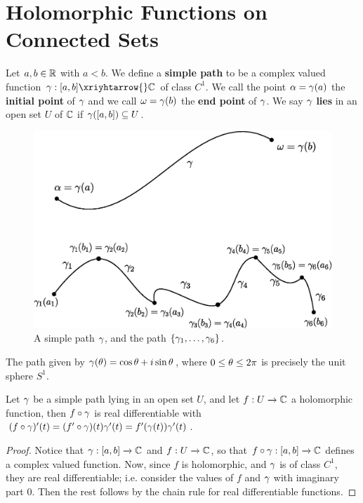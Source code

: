 \section{Holomorphic Functions on Connected Sets}

\begin{definition}
    Let $a,b \in \mathbb{R}$ with $a<b$. We define a \textbf{simple path} to be a
    complex valued function $\y:[a,b] \xriyhtarrow{} \C$ of class $C^1$. We call
    the point $\alpha=\gamma(a)$ the \textbf{initial point} of $\gamma$ and we call
    $\omega=\gamma(b)$ the \textbf{end point} of $\gamma$. We say $\gamma$ \textbf{lies} in an
    open set $U$ of $\mathbb{C}$ if  $\gamma([a,b]) \subseteq U$.
\end{definition}

\begin{figure}[h]
    \centering
    \includegraphics[scale=0.5]{Figures/Chapter3/path.eps}
    \caption{A simple path $\gamma$, and the path $\{\gamma_1, \dots, \gamma_6\}$.}
    \label{figure_3.1}
\end{figure}

\begin{example}\label{example_3.1}
    The path given by $\gamma(\theta)=\cos{\theta}+i\sin{\theta}$, where $0 \leq \theta \leq
    2\pi$ is precisely the unit sphere $S^1$.
\end{example}

\begin{lemma}\label{3.1.1}
    Let $\gamma$ be a simple path lying in an open set $U$, and let $f:U
    \xrightarrow{} \mathbb{C}$ a holomorphic function, then $f \circ \gamma$ is real
    differentiable with  $(f \circ \gamma)'(t)=(f' \circ \gamma)(t)\gamma'(t)=f'(\gamma(t))\gamma'(t)$.
\end{lemma}
\begin{proof}
    Notice that $\gamma:[a,b] \xrightarrow{} \mathbb{C}$ and $f:U \xrightarrow{} \mathbb{C}$, so
    that $f \circ \gamma:[a,b] \xrightarrow{} \mathbb{C}$ defines a complex valued function.
    Now, since $f$ is holomorphic, and $\gamma$ is of class $C^1$, they are real
    differentiable; i.e. consider the values of  $f$ and  $\gamma$ with imaginary
    part  $0$. Then the rest follows by the chain rule for real differentiable
    functions.
\end{proof}

